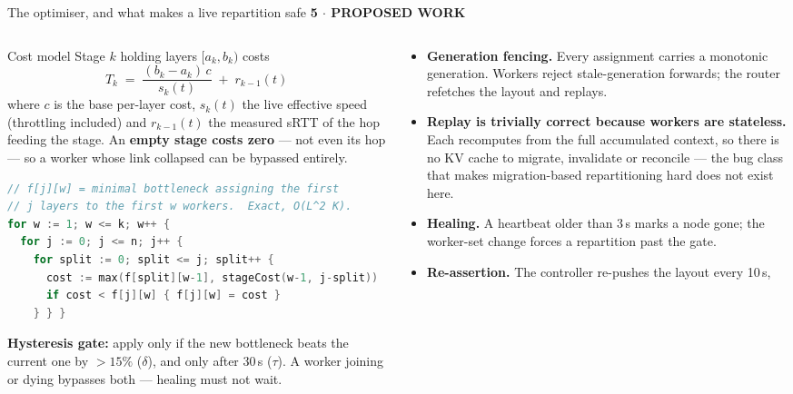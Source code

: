 \documentclass[aspectratio=169,9pt]{beamer}
\newcommand{\kicker}[1]{{\scriptsize\color{keBlue}\bfseries\MakeUppercase{#1}}\par\vspace{0.2em}}
\newcommand{\hl}[1]{\textbf{\color{keNavy}#1}}
\begin{document}
\begin{frame}[fragile,shrink=20]{The optimiser, and what makes a live repartition safe}
  \kicker{5 $\cdot$ Proposed Work}
  \begin{columns}[T]
    \begin{column}{0.48\textwidth}
      \begin{block}{Cost model}
        \scriptsize
        Stage $k$ holding layers $[a_k, b_k)$ costs
        \[ T_k \;=\; \frac{(b_k - a_k)\, c}{s_k(t)} \;+\; r_{k-1}(t) \]
        where $c$ is the base per-layer cost, $s_k(t)$ the live effective speed
        (throttling included) and $r_{k-1}(t)$ the measured sRTT of the hop
        feeding the stage. An \hl{empty stage costs zero} --- not even its hop ---
        so a worker whose link collapsed can be bypassed entirely.
      \end{block}
\begin{lstlisting}[language=Go, basicstyle=\ttfamily\tiny]
// f[j][w] = minimal bottleneck assigning the first
// j layers to the first w workers.  Exact, O(L^2 K).
for w := 1; w <= k; w++ {
  for j := 0; j <= n; j++ {
    for split := 0; split <= j; split++ {
      cost := max(f[split][w-1], stageCost(w-1, j-split))
      if cost < f[j][w] { f[j][w] = cost }
    } } }
\end{lstlisting}
      \scriptsize
      \hl{Hysteresis gate:} apply only if the new bottleneck beats the current
      one by $>15\%$ ($\delta$), and only after 30\,s ($\tau$). A worker joining
      or dying bypasses both --- healing must not wait.
    \end{column}
    \begin{column}{0.48\textwidth}
      \scriptsize
      \begin{itemize}\setlength\itemsep{0.5em}
        \item \hl{Generation fencing.} Every assignment carries a monotonic
          generation. Workers reject stale-generation forwards; the router
          refetches the layout and replays.
        \item \hl{Replay is trivially correct because workers are stateless.}
          Each recomputes from the full accumulated context, so there is no KV
          cache to migrate, invalidate or reconcile --- the bug class that makes
          migration-based repartitioning hard does not exist here.
        \item \hl{Healing.} A heartbeat older than 3\,s marks a node gone; the
          worker-set change forces a repartition past the gate.
        \item \hl{Re-assertion.} The controller re-pushes the layout every 10\,s,

\end{itemize}
\end{column}
\end{columns}
\end{frame}
\end{document}
